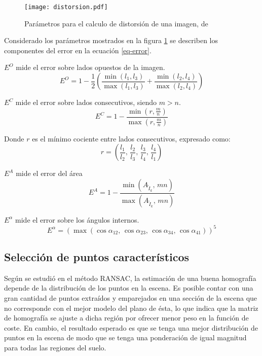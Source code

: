 \begin{figure}[h]
	\centering
	\texttt{[image: distorsion.pdf]}
	\caption[Distorsion de imagen]{Parámetros para el calculo de distorsión de una imagen, de \cite{bellavia-ref}}
	\label{imagen:distorsion}
\end{figure}

Considerado los parámetros mostrados en la figura \ref{imagen:distorsion} se describen los componentes del error en la ecuación \ref{eq-error}.

$E^O$ mide el error sobre lados opuestos de la imagen.
\begin{equation}
E^O = 1 - \frac{1}{2}  \left(  \frac{\min (l_1, l_3)}{\max (l_1, l_3)} +  \frac{\min (l_2, l_4)}{\max (l_2, l_4)} \right)
\end{equation}

$E^C$ mide el error sobre lados consecutivos, siendo $m > n$.
\begin{equation}
E^C = 1 - \frac{\min (r, \frac{m}{n})}{\max (r, \frac{m}{n})}
\end{equation}

Donde $r$ es el mínimo cociente entre lados consecutivos, expresado como:
\begin{displaymath}
r = \left( \frac{l_1}{l_2},\, \frac{l_2}{l_3},\, \frac{l_3}{l_4},\, \frac{l_4}{l_1} \right)
\end{displaymath}

$E^A$ mide el error del área
\begin{equation}
E^A = 1 - \frac{\min (A_{\tilde{I}_k},\, mn)}{\max (A_{\tilde{I}_k},\, mn)}
\end{equation}

$E^\alpha$ mide el error sobre los ángulos internos. 
\begin{equation}
E^\alpha = (\max (\cos\alpha_{12},\, \cos\alpha_{23},\, \cos\alpha_{34},\, \cos\alpha_{41}))^5
\end{equation}


\subsection{Selección de puntos característicos}

Según se estudió en el método RANSAC, la estimación de una buena homografía depende de la distribución de los puntos en la escena. Es posible contar con una gran cantidad de puntos extraídos y emparejados en una sección de la escena que no corresponde con el mejor modelo del plano de ésta, lo que indica que la matriz de homografía se ajuste a dicha región por ofrecer menor peso en la función de coste. En cambio, el resultado esperado es que se tenga una mejor distribución de puntos en la escena de modo que se tenga una ponderación de igual magnitud para todas las regiones del suelo.

